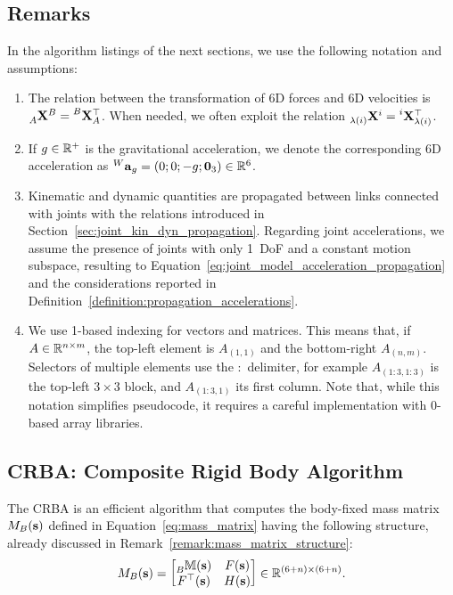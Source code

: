 \subsection{Remarks}
%
In the algorithm listings of the next sections, we use the following notation and assumptions:
%
\begin{enumerate}
%
\item The relation between the transformation of 6D forces and 6D velocities is $\transfor[A]^B = \transvel[B]_A^\top$.
When needed, we often exploit the relation $\transfor[\lambda(i)]^i = \transvel[i]_{\lambda(i)}^\top$.
%
\item If $g \in \realn^+$ is the gravitational acceleration, we denote the corresponding 6D acceleration as $\accsix[W]_g = (0; 0; -g; \zeros_3) \in \realn^6$.
%
\item Kinematic and dynamic quantities are propagated between links connected with joints with the relations introduced in Section~\ref{sec:joint_kin_dyn_propagation}.
Regarding joint accelerations, we assume the presence of joints with only 1~\ac{DoF} and a constant motion subspace, resulting to Equation~\eqref{eq:joint_model_acceleration_propagation} and the considerations reported in Definition~\ref{definition:propagation_accelerations}.
%
\item We use 1-based indexing for vectors and matrices.
This means that, if $A \in \realn^{n \times m}$, the top-left element is $A_{(1, 1)}$ and the bottom-right $A_{(n,m)}$.
Selectors of multiple elements use the $:$ delimiter, for example $A_{(1:3,1:3)}$ is the top-left $3 \times 3$ block, and $A_{(1:3,1)}$ its first column.
Note that, while this notation simplifies pseudocode, it requires a careful implementation with 0-based array libraries.
%
\end{enumerate}

\subsection{CRBA: Composite Rigid Body Algorithm}

The \ac{CRBA} is an efficient algorithm that computes the body-fixed mass matrix $M_B(\Shape)$ defined in Equation~\eqref{eq:mass_matrix} having the following structure, already discussed in Remark~\ref{remark:mass_matrix_structure}:
%
\begin{equation*}
    M_B(\Shape) = 
    \begin{bmatrix}
        \masssix[B](\Shape) & F(\Shape) \\
        F^\top(\Shape) & H(\Shape)
    \end{bmatrix}
    \in \realn^{(6+n)\times(6+n)}
    .
\end{equation*}


